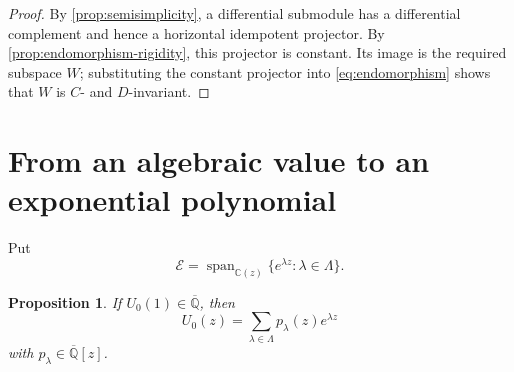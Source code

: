 \documentclass[11pt]{article}
\numberwithin{equation}{section}
\newtheorem{proposition}[proposition]{Proposition}
\theoremstyle{definition}
\theoremstyle{remark}
\newcommand{\C}{\mathbb C}
\newcommand{\Qbar}{\overline{\mathbb Q}}
\newcommand{\Span}{\operatorname{span}}
\newcommand{\Ecal}{\mathcal E}
\begin{document}
\begin{proof}
By \cref{prop:semisimplicity}, a differential submodule has a differential
complement and hence a horizontal idempotent projector.  By
\cref{prop:endomorphism-rigidity}, this projector is constant.  Its image
is the required subspace $W$; substituting the constant projector into
\eqref{eq:endomorphism} shows that $W$ is $C$- and $D$-invariant.
\end{proof}

\section{From an algebraic value to an exponential polynomial}

Put
\[
  \Ecal=\Span_{\C(z)}\{e^{\lambda z}:\lambda\in\Lambda\}.
\]

\begin{proposition}\label{prop:exp-poly}
If $U_0(1)\in\Qbar$, then
\begin{equation}\label{eq:exp-poly}
  U_0(z)=\sum_{\lambda\in\Lambda}p_\lambda(z)e^{\lambda z}
\end{equation}
with $p_\lambda\in\Qbar[z]$.
\end{proposition}
\end{document}
